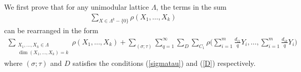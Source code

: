 \documentclass[11pt]{article}
\theoremstyle{definition}
\theoremstyle{proof}
\begin{document}
We first prove that for any unimodular lattice $\Lambda$, the terms in the sum
\begin{align}\label{awfulsumlhsi}
    \sum_{X \in \Lambda ^k - \{0\}} \rho(X_1, \ldots, X_k)
\end{align}
can be rearranged in the form
\begin{align}\label{awfulsumrhsi}
    \sum_{\substack{X_1, \ldots, X_k \in \Lambda \\ \dim (X_1, \ldots, X_k) = k}} \rho(X_1, \ldots, X_k) + \sum_{(\sigma ; \tau )}\sum_{q = 1}^{\infty} \sum_{D} \sum_{C_1} \rho\bigg(\sum_{i=1}^{m}\frac{d_{i1}}{q}Y_i, \ldots, \sum_{i=1}^{m}\frac{d_{ik}}{q}Y_i \bigg)
\end{align}
where $(\sigma; \tau )$ and $D$ satisfies the conditions (\ref{sigmatau}) and (\ref{D}) respectively.
\end{document}
